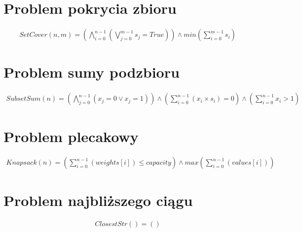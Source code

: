 \section{Problem pokrycia zbioru}

\begin{align*}
	SetCover(n, m) = \left( \bigwedge_{i=0}^{n-1} (\bigvee_{j=0}^{m-1} s_j = True) \right) \land 
	min \left( \sum_{i=0}^{m-1} s_i \right) 
\end{align*}

\section{Problem sumy podzbioru}

\begin{align*}
	SubsetSum(n) = \left( \bigwedge_{j=0}^{n-1} (x_j = 0 \lor x_j = 1) \right) \land 
	\left( \sum_{i=0}^{n-1} (x_i \times s_i) = 0 \right) \land 
	\left( \sum_{i=0}^{n-1} x_i > 1 \right)
\end{align*}

\section{Problem plecakowy}

\begin{align*}
	Knapsack(n) = \left( \sum_{i=0}^{n-1} (weights[i]) \leq capacity \right) \land 
	max \left( \sum_{i=0}^{n-1} (values[i]) \right)
\end{align*}

\section{Problem najbliższego ciągu}

\begin{align*}
	ClosestStr() = \left(  \right) 
\end{align*}
